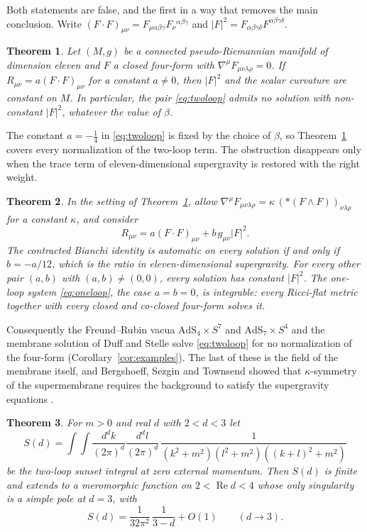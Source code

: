 \documentclass[11pt]{amsart}
\newtheorem{mainthm}{Theorem}
\theoremstyle{definition}
\newcommand{\FF}{(F\!\cdot\! F)}
\begin{document}
Both statements are false, and the first in a way that removes the main conclusion. Write $\FF_{\mu\nu}=F_{\mu\alpha\beta\gamma}F_\nu{}^{\alpha\beta\gamma}$ and $|F|^2=F_{\alpha\beta\gamma\delta}F^{\alpha\beta\gamma\delta}$.

\begin{mainthm}\label{thm:A}
Let $(M,g)$ be a connected pseudo-Riemannian manifold of dimension eleven and $F$ a closed four-form with $\nabla^\mu F_{\mu\nu\lambda\rho}=0$. If $R_{\mu\nu}=a\FF_{\mu\nu}$ for a constant $a\neq0$, then $|F|^2$ and the scalar curvature are constant on $M$. In particular, the pair \eqref{eq:twoloop} admits no solution with non-constant $|F|^2$, whatever the value of $\beta$.
\end{mainthm}

The constant $a=-\frac14$ in \eqref{eq:twoloop} is fixed by the choice of $\beta$, so Theorem~\ref{thm:A} covers every normalization of the two-loop term. The obstruction disappears only when the trace term of eleven-dimensional supergravity \cite{CJS78} is restored with the right weight.

\begin{mainthm}\label{thm:B}
In the setting of Theorem~\ref{thm:A}, allow $\nabla^\mu F_{\mu\nu\lambda\rho}=\kappa\,(\ast(F\wedge F))_{\nu\lambda\rho}$ for a constant $\kappa$, and consider
\[
R_{\mu\nu}=a\FF_{\mu\nu}+b\,g_{\mu\nu}|F|^2 .
\]
The contracted Bianchi identity is automatic on every solution if and only if $b=-a/12$, which is the ratio in eleven-dimensional supergravity. For every other pair $(a,b)$ with $(a,b)\ne(0,0)$, every solution has constant $|F|^2$. The one-loop system \eqref{eq:oneloop}, the case $a=b=0$, is integrable: every Ricci-flat metric together with every closed and co-closed four-form solves it.
\end{mainthm}

Consequently the Freund--Rubin vacua $\mathrm{AdS}_4\times S^7$ and $\mathrm{AdS}_7\times S^4$ \cite{FR80} and the membrane solution of Duff and Stelle \cite{DS91} solve \eqref{eq:twoloop} for no normalization of the four-form (Corollary~\ref{cor:examples}). The last of these is the field of the membrane itself, and Bergshoeff, Sezgin and Townsend showed that $\kappa$-symmetry of the supermembrane requires the background to satisfy the supergravity equations \cite{BST87}.

\begin{mainthm}\label{thm:C}
For $m>0$ and real $d$ with $2<d<3$ let
\[
S(d)=\int\!\!\int\frac{d^dk}{(2\pi)^d}\frac{d^dl}{(2\pi)^d}\,\frac{1}{(k^2+m^2)(l^2+m^2)((k+l)^2+m^2)}
\]
be the two-loop sunset integral at zero external momentum. Then $S(d)$ is finite and extends to a meromorphic function on $2<\operatorname{Re}d<4$ whose only singularity is a simple pole at $d=3$, with
\[
S(d)=\frac{1}{32\pi^2}\,\frac{1}{3-d}+O(1)\qquad(d\to3).
\]
\end{mainthm}
\end{document}
